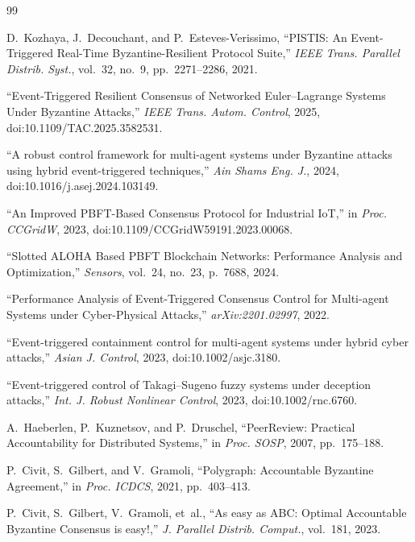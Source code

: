 \documentclass[manuscript,screen,review]{acmart}
\begin{document}
\begin{thebibliography}{99}

D.~Kozhaya, J.~Decouchant, and P.~Esteves-Verissimo,
``PISTIS: An Event-Triggered Real-Time Byzantine-Resilient Protocol Suite,''
\textit{IEEE Trans. Parallel Distrib. Syst.}, vol.~32, no.~9, pp.~2271--2286, 2021.

``Event-Triggered Resilient Consensus of Networked Euler--Lagrange Systems Under Byzantine Attacks,''
\textit{IEEE Trans. Autom. Control}, 2025, doi:10.1109/TAC.2025.3582531.

``A robust control framework for multi-agent systems under Byzantine attacks using hybrid event-triggered techniques,''
\textit{Ain Shams Eng. J.}, 2024, doi:10.1016/j.asej.2024.103149.

``An Improved PBFT-Based Consensus Protocol for Industrial IoT,''
in \textit{Proc. CCGridW}, 2023, doi:10.1109/CCGridW59191.2023.00068.

``Slotted ALOHA Based PBFT Blockchain Networks: Performance Analysis and Optimization,''
\textit{Sensors}, vol.~24, no.~23, p.~7688, 2024.

``Performance Analysis of Event-Triggered Consensus Control for Multi-agent Systems under Cyber-Physical Attacks,''
\textit{arXiv:2201.02997}, 2022.

``Event-triggered containment control for multi-agent systems under hybrid cyber attacks,''
\textit{Asian J. Control}, 2023, doi:10.1002/asjc.3180.

``Event-triggered control of Takagi--Sugeno fuzzy systems under deception attacks,''
\textit{Int. J. Robust Nonlinear Control}, 2023, doi:10.1002/rnc.6760.

A.~Haeberlen, P.~Kuznetsov, and P.~Druschel,
``PeerReview: Practical Accountability for Distributed Systems,''
in \textit{Proc. SOSP}, 2007, pp.~175--188.

P.~Civit, S.~Gilbert, and V.~Gramoli,
``Polygraph: Accountable Byzantine Agreement,''
in \textit{Proc. ICDCS}, 2021, pp.~403--413.

P.~Civit, S.~Gilbert, V.~Gramoli, et~al.,
``As easy as ABC: Optimal Accountable Byzantine Consensus is easy!,''
\textit{J. Parallel Distrib. Comput.}, vol.~181, 2023.


\end{thebibliography}
\end{document}
